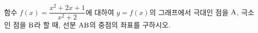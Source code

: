 함수 $f(x)=\dfrac{x^2+2x+1}{x^2+2}$에 대하여 $y=f(x)$의 그래프에서 극대인 점을 $\mathrm{A}$, 극소인 점을 $\mathrm{B}$라 할 때, 선분 $\mathrm{AB}$의 중점의 좌표를 구하시오.
